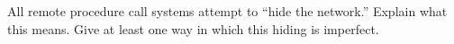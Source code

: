 \documentclass[12pt]{examdesign}
\begin{document}
\begin{shortanswer}


  \begin{question}
    All remote procedure call systems attempt to ``hide the network.'' Explain what this means.
    Give at least one way in which this hiding is imperfect.
  \end{question}

\end{shortanswer}
\end{document}
